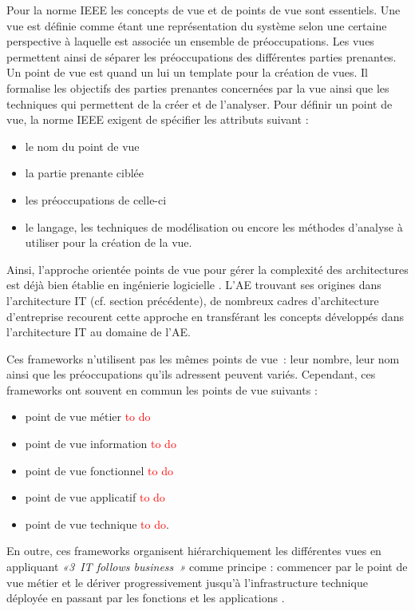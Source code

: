 Pour la norme IEEE les concepts de vue et de points de vue sont essentiels. 
Une vue est définie comme étant une représentation du système selon une certaine 
perspective à laquelle est associée un ensemble de préoccupations. Les vues 
permettent ainsi de séparer les préoccupations des différentes parties 
prenantes. Un point de vue est quand un lui un template pour la création de 
vues. Il formalise les objectifs des parties prenantes concernées par la vue 
ainsi que les techniques qui permettent de la créer et de l'analyser. Pour 
définir un point de vue, la norme IEEE exigent de spécifier les attributs 
suivant :
\begin{itemize}
\item le nom du point de vue
\item la partie prenante ciblée
\item les préoccupations de celle-ci
\item le langage, les techniques de modélisation ou encore les méthodes 
d'analyse à utiliser pour la création de la vue. 
\end{itemize}


Ainsi, l'approche orientée points de vue pour gérer la complexité des 
architectures est déjà bien établie en ingénierie logicielle 
\cite{steen2004supporting}. L'AE trouvant ses origines dans l'architecture IT 
(cf. section précédente), de nombreux cadres d'architecture d'entreprise 
recourent cette approche en transférant les concepts développés dans 
l'architecture IT au domaine de l'AE.

Ces frameworks n'utilisent pas les mêmes points de vue~: leur nombre, leur nom 
ainsi que les préoccupations qu'ils adressent peuvent variés. Cependant, ces 
frameworks ont souvent en commun les points de vue suivants :
\begin{itemize}
\item point de vue métier \textcolor{red}{to do}
\item point de vue information \textcolor{red}{to do}
\item point de vue fonctionnel \textcolor{red}{to do}
\item point de vue applicatif \textcolor{red}{to do}
\item point de vue technique \textcolor{red}{to do}.
\end{itemize} 
En outre, ces frameworks organisent hiérarchiquement les différentes vues en 
appliquant \emph{«3~IT follows business~»} comme principe : commencer par le 
point de vue métier et le dériver progressivement jusqu'à l'infrastructure 
technique déployée en passant par les fonctions et les applications 
\cite{winter2006essential}.



